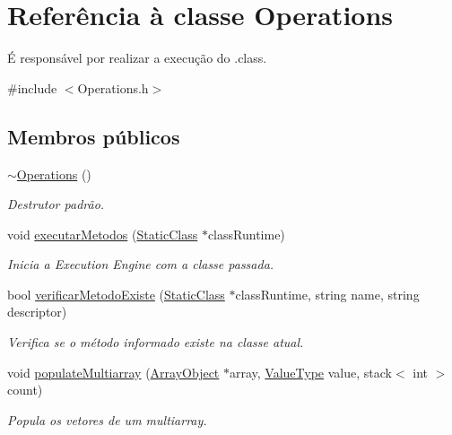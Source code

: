 \hypertarget{classOperations}{}\section{Referência à classe Operations}
\label{classOperations}


É responsável por realizar a execução do .class.  




{\ttfamily \#include $<$Operations.\+h$>$}

\subsection*{Membros públicos}
\begin{DoxyCompactItemize}
\item 
\hyperlink{classOperations_acfd66736f28837cca7379254a6eb988c}{$\sim$\+Operations} ()
\begin{DoxyCompactList}\small\item\em Destrutor padrão. \end{DoxyCompactList}\item 
void \hyperlink{classOperations_ab771bdb83af6f55d93d126b944d4e73b}{executar\+Metodos} (\hyperlink{classStaticClass}{Static\+Class} $\ast$class\+Runtime)
\begin{DoxyCompactList}\small\item\em Inicia a Execution Engine com a classe passada. \end{DoxyCompactList}\item 
bool \hyperlink{classOperations_a397caddc1ff805c556d3b71c9e525e3f}{verificar\+Metodo\+Existe} (\hyperlink{classStaticClass}{Static\+Class} $\ast$class\+Runtime, string name, string descriptor)
\begin{DoxyCompactList}\small\item\em Verifica se o método informado existe na classe atual. \end{DoxyCompactList}\item 
void \hyperlink{classOperations_af5306e6b717783a9752af2bbc922e36b}{populate\+Multiarray} (\hyperlink{classArrayObject}{Array\+Object} $\ast$array, \hyperlink{BasicTypes_8h_ad9971b6ef33e02ba2c75d19c1d2518a1}{Value\+Type} value, stack$<$ int $>$ count)
\begin{DoxyCompactList}\small\item\em Popula os vetores de um multiarray. \end{DoxyCompactList}\end{DoxyCompactItemize}

